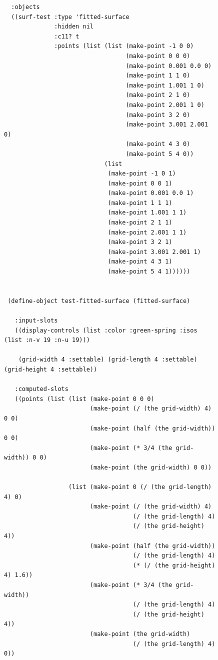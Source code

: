 \documentclass [11pt]{book}
\begin{document}
\begin{itemize}
\begin{figure}
\begin{lrbox}{\boxedverb}
\begin{minipage}{\linewidth}
{\begin{verbatim}
  :objects
  ((surf-test :type 'fitted-surface
              :hidden nil
              :c11? t
              :points (list (list (make-point -1 0 0)
                                  (make-point 0 0 0) 
                                  (make-point 0.001 0.0 0)
                                  (make-point 1 1 0)
                                  (make-point 1.001 1 0)
                                  (make-point 2 1 0)
                                  (make-point 2.001 1 0)
                                  (make-point 3 2 0)
                                  (make-point 3.001 2.001 0)
                                  (make-point 4 3 0) 
                                  (make-point 5 4 0))   
                            (list
                             (make-point -1 0 1)
                             (make-point 0 0 1) 
                             (make-point 0.001 0.0 1)
                             (make-point 1 1 1)
                             (make-point 1.001 1 1)
                             (make-point 2 1 1)
                             (make-point 2.001 1 1)
                             (make-point 3 2 1)
                             (make-point 3.001 2.001 1)
                             (make-point 4 3 1)
                             (make-point 5 4 1))))))


 (define-object test-fitted-surface (fitted-surface) 

   :input-slots
   ((display-controls (list :color :green-spring :isos (list :n-v 19 :n-u 19)))
   
    (grid-width 4 :settable) (grid-length 4 :settable) (grid-height 4 :settable))
  
   :computed-slots
   ((points (list (list (make-point 0 0 0)
                        (make-point (/ (the grid-width) 4) 0 0)
                        (make-point (half (the grid-width)) 0 0)
                        (make-point (* 3/4 (the grid-width)) 0 0)
                        (make-point (the grid-width) 0 0))
                         
                  (list (make-point 0 (/ (the grid-length) 4) 0)
                        (make-point (/ (the grid-width) 4) 
                                    (/ (the grid-length) 4) 
                                    (/ (the grid-height) 4))
                        (make-point (half (the grid-width)) 
                                    (/ (the grid-length) 4) 
                                    (* (/ (the grid-height) 4) 1.6))
                        (make-point (* 3/4 (the grid-width)) 
                                    (/ (the grid-length) 4) 
                                    (/ (the grid-height) 4))
                        (make-point (the grid-width) 
                                    (/ (the grid-length) 4) 0))
                         

\end{verbatim}}
\end{minipage}
\end{lrbox}
\end{figure}
\end{itemize}
\end{document}
